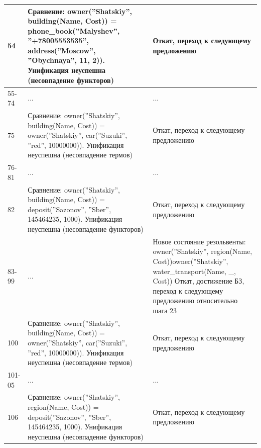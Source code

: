 \documentclass[12pt]{report}
\begin{document}
\begin{table}[H]
	\begin{center}
		\begin{tabular}{|p{1 cm}|p{10 cm}|p{8 cm}|}
			\hline
			54 & Сравнение: \newline owner(''Shatskiy'', building(Name, Cost)) = \newline phone\_book(''Malyshev'', ''+78005553535'', address(''Moscow'', ''Obychnaya'', 11, 2)). \newline Унификация неуспешна (несовпадение функторов) & Откат, переход к следующему предложению \\
			\hline
			55-74 & ... & ... \\
			\hline
			75 & Сравнение: \newline owner(''Shatskiy'', building(Name, Cost)) = \newline owner(''Shatskiy'', car(''Suzuki'', ''red'', 10000000)). \newline Унификация неуспешна (несовпадение термов) & Откат, переход к следующему предложению \\
			\hline
			76-81 & ... & ... \\
			\hline
			82 & Сравнение: \newline owner(''Shatskiy'', building(Name, Cost)) = \newline deposit(''Sazonov'', ''Sber'', 145464235, 1000). \newline Унификация неуспешна (несовпадение функторов) & Откат, переход к следующему предложению \\
			\hline
			83-99 & ... & Новое состояние резольвенты: \newline owner(''Shatskiy'', region(Name, Cost))\newline owner(''Shatskiy'', water\_transport(Name, \_, Cost)) \newline Откат, достижение БЗ, переход к следующему предложению относительно шага 23 \\
			\hline
			100 & Сравнение: \newline owner(''Shatskiy'', building(Name, Cost)) = \newline owner(''Shatskiy'', car(''Suzuki'', ''red'', 10000000)). \newline Унификация неуспешна (несовпадение термов) & Откат, переход к следующему предложению \\
			\hline
			101-05 & ... & ... \\
			\hline
			106 & Сравнение: \newline owner(''Shatskiy'', region(Name, Cost)) = \newline deposit(''Sazonov'', ''Sber'', 145464235, 1000). \newline Унификация неуспешна (несовпадение функторов) & Откат, переход к следующему предложению \\

\end{tabular}
\end{center}
\end{table}
\end{document}

